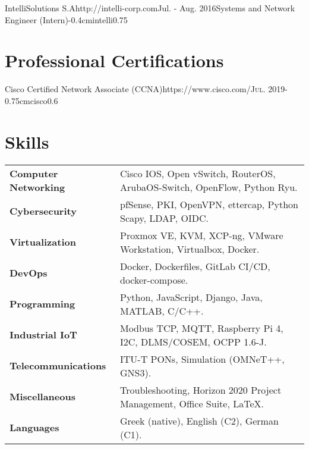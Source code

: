 \documentclass{mycv}
\begin{document}
	\vspace*{0.5cm}	

	\begin{EntryDatedLogo}{IntelliSolutions S.A}{http://intelli-corp.com}{Jul. - Aug. 2016}{Systems and Network Engineer (Intern)}{-0.4cm}{intelli}{0.75}
	\end{EntryDatedLogo}

	\vspace*{0.5cm}
		
	\section{Professional Certifications}
	\begin{EntryDatedLogo}{Cisco Certified Network Associate (CCNA)}{https://www.cisco.com/}{\scshape{Jul. 2019}}{}{-0.75cm}{cisco}{0.6}
	\end{EntryDatedLogo}
	
	\section{Skills}
	\begin{tabular}{m{4.5cm} m{13cm}}\renewcommand{\arraystretch}{2}
		\textbf{Computer Networking}   	& Cisco IOS, Open vSwitch, RouterOS, ArubaOS-Switch, OpenFlow, Python Ryu.\\
		\textbf{Cybersecurity}			& pfSense, PKI, OpenVPN, ettercap, Python Scapy, LDAP, OIDC. \\
		\textbf{Virtualization}			& Proxmox VE, KVM, XCP-ng, VMware Workstation, Virtualbox, Docker.\\ 
		\textbf{DevOps}					& Docker, Dockerfiles, GitLab CI/CD, docker-compose. \\
		\textbf{Programming} 	    	& Python, JavaScript, Django, Java, MATLAB, C/C++. \\
		\textbf{Industrial IoT}			& Modbus TCP, MQTT, Raspberry Pi 4, I2C, DLMS/COSEM, OCPP 1.6-J.\\
		\textbf{Telecommunications}   	& ITU-T PONs, Simulation (OMNeT++, GNS3). \\
		\textbf{Miscellaneous}			& Troubleshooting, Horizon 2020 Project Management, Office Suite, \LaTeX. \\
		\textbf{Languages} 				& Greek (native), English (C2), German (C1).
	\end{tabular}
\end{document}
